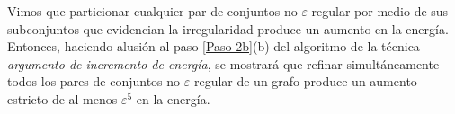 \documentclass{article}[14pts]
\newcommand{\hh}[1]{{\color{red} * #1 *}}
\newcommand{\var}{\mathrm{Var}}
\let\varepsilon=\varepsilon
\begin{document}
%
%
%

Vimos que particionar cualquier par de conjuntos no $\varepsilon$-regular por medio de sus subconjuntos que evidencian la irregularidad produce un aumento en la energía. Entonces, haciendo alusión al paso \ref{Paso 2b}(b) del algoritmo de la técnica \emph{argumento de incremento de energía}, se mostrará que refinar simultáneamente todos los pares de conjuntos no $\varepsilon$-regular de un grafo produce un aumento estricto de al menos $\varepsilon^{5}$ en la energía.\medskip
\end{document}
